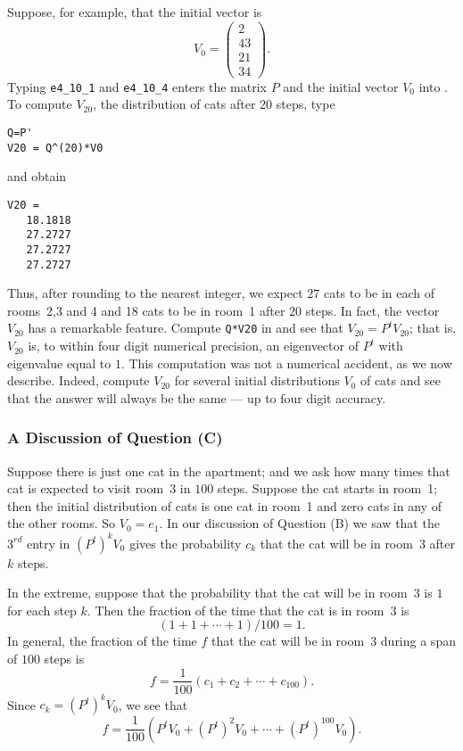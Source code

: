 \documentclass{ximera}
\begin{document}
Suppose, for example, that the initial vector is
\begin{equation*}
V_0 =\left(\begin{array}{c} 2 \\ 43 \\ 21 \\ 34 \end{array}\right).
\end{equation*}
Typing {\tt e4\_10\_1} and {\tt e4\_10\_4} enters the matrix $P$ and the
initial vector $V_0$ into \Matlabp.  To compute $V_{20}$, the distribution
of cats after $20$ steps, type
\begin{verbatim}
Q=P'
V20 = Q^(20)*V0
\end{verbatim}
and obtain
\begin{verbatim}
V20 =
   18.1818
   27.2727
   27.2727
   27.2727
\end{verbatim}
Thus, after rounding to the nearest integer, we expect $27$ cats to be in
each of rooms~2,3 and 4 and 18 cats to be in room~1 after $20$ steps.  In
fact, the vector $V_{20}$
has a remarkable feature.  Compute {\tt Q*V20} in \Matlab and see that
$V_{20} = P^tV_{20}$; that is, $V_{20}$ is, to within four digit numerical
precision, an eigenvector of $P^t$ with eigenvalue equal to $1$.  This
computation was not a numerical accident, as we now describe.  Indeed,
compute $V_{20}$ for several initial distributions $V_0$ of cats and see that
the answer will always be the same --- up to four digit accuracy.

\subsubsection*{A Discussion of Question (C)}

Suppose there is just one cat in the apartment; and we ask how many times that
cat is expected to visit room~3 in $100$ steps.  Suppose the cat starts in
room~1; then the initial distribution of cats is one cat in room~1 and zero
cats in any of the other rooms.  So $V_0=e_1$.  In our discussion of
Question (B) we saw that the $3^{rd}$ entry in $(P^t)^kV_0$ gives the
probability $c_k$ that the cat will be in room~3 after $k$ steps.

In the extreme, suppose that the probability that the cat will be in room~3 is
$1$ for each step $k$.  Then the fraction of the time that the cat is in room~3
is
\[
(1 + 1 + \cdots + 1)/100 = 1.
\]
In general, the fraction of the time $f$ that the cat will be in room~3
during a span of $100$ steps is
\[
f = \frac{1}{100}(c_1 + c_2 +\cdots + c_{100}).
\]
Since $c_k = (P^t)^kV_0$, we see that
\begin{equation}  \label{E:f}
f = \frac{1}{100}(P^tV_0 + (P^t)^2V_0 + \cdots + (P^t)^{100}V_0).
\end{equation}
\end{document}
